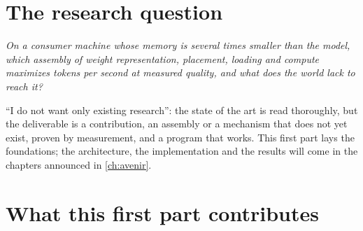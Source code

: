 \section{The research question}

\begin{center}
\begin{tcolorbox}[enhanced, width=0.92\linewidth, colback=Fond, colframe=Accent, boxrule=0.6pt, arc=1pt]
\emph{On a consumer machine whose memory is several times smaller than the model, which assembly of weight representation, placement, loading and compute maximizes tokens per second at measured quality, and what does the world lack to reach it?}
\end{tcolorbox}
\end{center}

\enquote{I do not want only existing research}: the state of the art is read thoroughly, but the deliverable is a contribution, an assembly or a mechanism that does not yet exist, proven by measurement, and a program that works. This first part lays the foundations; the architecture, the implementation and the results will come in the chapters announced in \cref{ch:avenir}.

\section{What this first part contributes}\label{sec:contributions}

